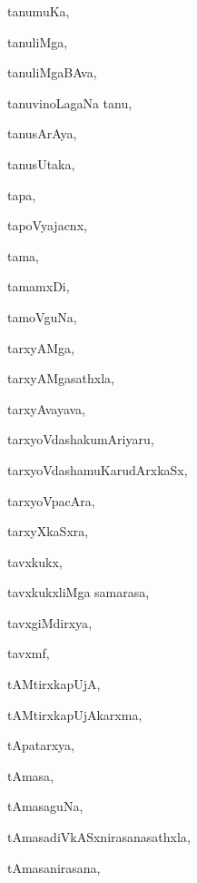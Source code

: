 \begin{multicols}{3}
{\noindent
{tanumuKa}, \pageref{tanumuKa}

\noindent
{tanuliMga}, \pageref{tanuliMga}

\noindent
{tanuliMgaBAva}, \pageref{tanuliMgaBAva}

\noindent
{tanuvinoLagaNa tanu}, \pageref{tanuvinoLagaNa tanu}

\noindent
{tanusArAya}, \pageref{tanusArAya}

\noindent
{tanusUtaka}, \pageref{tanusUtaka}

\noindent
{tapa}, \pageref{tapa}

\noindent
{tapoVyajacnx}, \pageref{tapoVyajacnx}

\noindent
{tama}, \pageref{tama}

\noindent
{tamamxDi}, \pageref{tamamxDi}

\noindent
{tamoVguNa}, \pageref{tamoVguNa}

\noindent
{tarxyAMga}, \pageref{tarxyAMga}

\noindent
{tarxyAMgasathxla}, \pageref{tarxyAMgasathxla}

\noindent
{tarxyAvayava}, \pageref{tarxyAvayava}

\noindent
{tarxyoVdashakumAriyaru}, \pageref{tarxyoVdashakumAriyaru}

\noindent
{tarxyoVdashamuKarudArxkaSx}, \pageref{tarxyoVdashamuKarudArxkaSx}

\noindent
{tarxyoVpacAra}, \pageref{tarxyoVpacAra}

\noindent
{tarxyXkaSxra}, \pageref{tarxyXkaSxra}

\noindent
{tavxkukx}, \pageref{tavxkukx}

\noindent
{tavxkukxliMga samarasa}, \pageref{tavxkukxliMga samarasa}

\noindent
{tavxgiMdirxya}, \pageref{tavxgiMdirxya}

\noindent
{tavxmf}, \pageref{tavxmf}

\noindent
{tAMtirxkapUjA}, \pageref{tAMtirxkapUjA}

\noindent
{tAMtirxkapUjAkarxma}, \pageref{tAMtirxkapUjAkarxma}

\noindent
{tApatarxya}, \pageref{tApatarxya}

\noindent
{tAmasa}, \pageref{tAmasa}

\noindent
{tAmasaguNa}, \pageref{tAmasaguNa}

\noindent
{tAmasadiVkASxnirasanasathxla}, \pageref{tAmasadiVkASxnirasanasathxla}

\noindent
{tAmasanirasana}, \pageref{tAmasanirasana}

}
\end{multicols}
